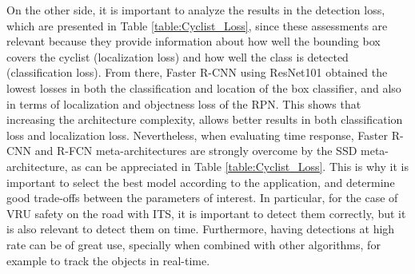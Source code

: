 \documentclass[journal]{IEEEtran}
\begin{document}
On the other side, it is important to analyze the results in the detection loss, which are presented in Table \ref{table:Cyclist_Loss}, since these assessments are relevant because they provide information about how well the bounding box covers the cyclist (localization loss) and how well the class is detected (classification loss). From there, Faster R-CNN using ResNet101 obtained the lowest losses in both the classification and location of the box classifier, and also in terms of localization and objectness loss of the RPN. This shows that increasing the architecture complexity, allows better results in both classification loss and localization loss. Nevertheless, when evaluating time response, Faster R-CNN and R-FCN meta-architectures are strongly overcome by the SSD meta-architecture, as can be appreciated in Table \ref{table:Cyclist_Loss}. This is why it is important to select the best model according to the application, and determine good trade-offs between the parameters of interest. In particular, for the case of  VRU safety on the road with ITS, it is important to detect them correctly, but it is also relevant to detect them on time. Furthermore, having detections at high rate can be of great use, specially when combined with other algorithms, for example to track the objects in real-time.
\end{document}
